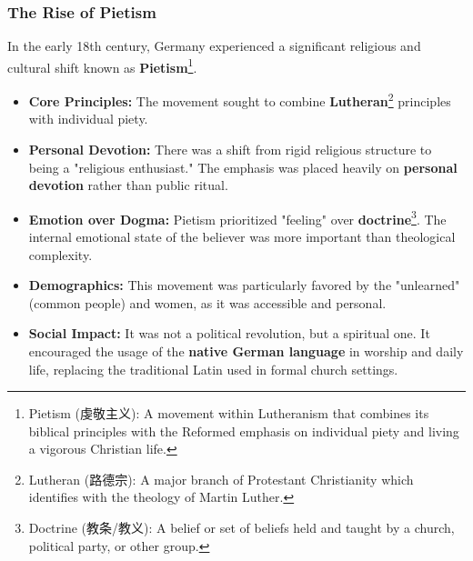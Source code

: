 \documentclass[math,code]{amznotes}
\theoremstyle{remark}
\begin{document}
\subsubsection{The Rise of Pietism}
In the early 18th century, Germany experienced a significant religious and cultural shift known as \textbf{Pietism}\footnote{Pietism (虔敬主义): A movement within Lutheranism that combines its biblical principles with the Reformed emphasis on individual piety and living a vigorous Christian life.}.
\begin{itemize}
    \item \textbf{Core Principles:} The movement sought to combine \textbf{Lutheran}\footnote{Lutheran (路德宗): A major branch of Protestant Christianity which identifies with the theology of Martin Luther.} principles with individual piety.
    \item \textbf{Personal Devotion:} There was a shift from rigid religious structure to being a "religious enthusiast." The emphasis was placed heavily on \textbf{personal devotion} rather than public ritual.
    \item \textbf{Emotion over Dogma:} Pietism prioritized "feeling" over \textbf{doctrine}\footnote{Doctrine (教条/教义): A belief or set of beliefs held and taught by a church, political party, or other group.}. The internal emotional state of the believer was more important than theological complexity.
    \item \textbf{Demographics:} This movement was particularly favored by the "unlearned" (common people) and women, as it was accessible and personal.
    \item \textbf{Social Impact:} It was not a political revolution, but a spiritual one. It encouraged the usage of the \textbf{native German language} in worship and daily life, replacing the traditional Latin used in formal church settings.
\end{itemize}
\end{document}
